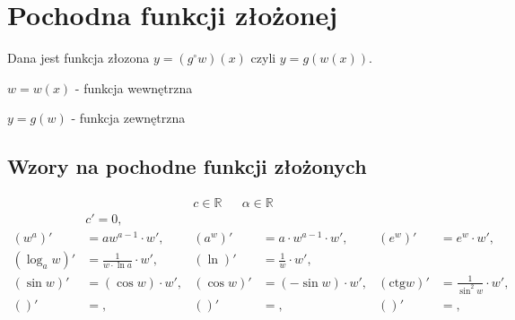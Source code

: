 \documentclass[11pt]{article}
\begin{document}
\section{Pochodna funkcji złożonej}
\label{sec:org5481ad9}
Dana jest funkcja złozona \(y = (g^\circ w)(x)\) czyli \(y = g(w(x))\).

\(w = w(x)\) - funkcja wewnętrzna

\(y = g(w)\) - funkcja zewnętrzna

\subsection{Wzory na pochodne funkcji złożonych}
\label{sec:org14ec3af}
\begin{align*}
c \in \mathbb{R} && \alpha \in \mathbb{R}
\end{align*}
\begin{align*}
  & c' = 0,
  \\ \left(w^{a}\right)'&= a w^{a-1} \cdot w',
                        & \left(a^{w} \right)' &= a  \cdot w^{a-1} \cdot w',
                                               & \left( e^{w} \right)' &= e^{w} \cdot w',
  \\ \left(\log_{a}w \right)' &= \frac{1}{w \cdot \ln a} \cdot w',
                        & \left( \ln \right)' &= \frac{1}{w} \cdot w',
  \\ \left( \sin w \right)' &= (\cos w) \cdot w',
                        & \left( \cos w \right)' &= (- \sin w) \cdot w',
                                               & \left(\text{ctg} w \right)' &= \frac{1}{\sin^{2} w} \cdot w',
  \\ \left( \right)' &= ,
                        & \left(\right)' &=,
                                               & \left(\right)' &=,
\end{align*}
\end{document}
